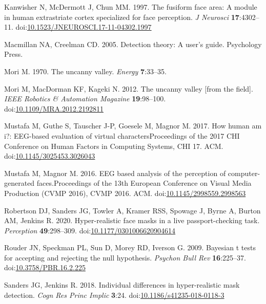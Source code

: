 \documentclass[
]{article}
\newlength{\cslhangindent}
\newlength{\cslentryspacingunit} %
\newenvironment{CSLReferences}[2] %
 {%
  \setlength{\parindent}{0pt}
  \ifodd #1
  \let\oldpar\par
  \def\par{\hangindent=\cslhangindent\oldpar}
  \fi
  \setlength{\parskip}{#2\cslentryspacingunit}
 }%
 {}
\begin{document}
\begin{CSLReferences}{1}{0}
\leavevmode{}%
Kanwisher N, McDermott J, Chun MM. 1997. The fusiform face area: A module in human extrastriate cortex specialized for face perception. \emph{J Neurosci} \textbf{17}:4302--11. doi:\href{https://doi.org/10.1523/JNEUROSCI.17-11-04302.1997}{10.1523/JNEUROSCI.17-11-04302.1997}

\leavevmode{}%
Macmillan NA, Creelman CD. 2005. Detection theory: A user's guide. Psychology Press.

\leavevmode{}%
Mori M. 1970. The uncanny valley. \emph{Energy} \textbf{7}:33--35.

\leavevmode{}%
Mori M, MacDorman KF, Kageki N. 2012. The uncanny valley {[}from the field{]}. \emph{IEEE Robotics \& Automation Magazine} \textbf{19}:98--100. doi:\href{https://doi.org/10.1109/MRA.2012.2192811}{10.1109/MRA.2012.2192811}

\leavevmode{}%
Mustafa M, Guthe S, Tauscher J-P, Goesele M, Magnor M. 2017. How human am i?: EEG-based evaluation of virtual charactersProceedings of the 2017 CHI Conference on Human Factors in Computing Systems, CHI 17. ACM. doi:\href{https://doi.org/10.1145/3025453.3026043}{10.1145/3025453.3026043}

\leavevmode{}%
Mustafa M, Magnor M. 2016. EEG based analysis of the perception of computer-generated faces.Proceedings of the 13th European Conference on Visual Media Production (CVMP 2016), CVMP 2016. ACM. doi:\href{https://doi.org/10.1145/2998559.2998563}{10.1145/2998559.2998563}

\leavevmode{}%
Robertson DJ, Sanders JG, Towler A, Kramer RSS, Spowage J, Byrne A, Burton AM, Jenkins R. 2020. Hyper-realistic face masks in a live passport-checking task. \emph{Perception} \textbf{49}:298--309. doi:\href{https://doi.org/10.1177/0301006620904614}{10.1177/0301006620904614}

\leavevmode{}%
Rouder JN, Speckman PL, Sun D, Morey RD, Iverson G. 2009. Bayesian t tests for accepting and rejecting the null hypothesis. \emph{Psychon Bull Rev} \textbf{16}:225--37. doi:\href{https://doi.org/10.3758/PBR.16.2.225}{10.3758/PBR.16.2.225}

\leavevmode{}%
Sanders JG, Jenkins R. 2018. Individual differences in hyper-realistic mask detection. \emph{Cogn Res Princ Implic} \textbf{3}:24. doi:\href{https://doi.org/10.1186/s41235-018-0118-3}{10.1186/s41235-018-0118-3}


\end{CSLReferences}
\end{document}

